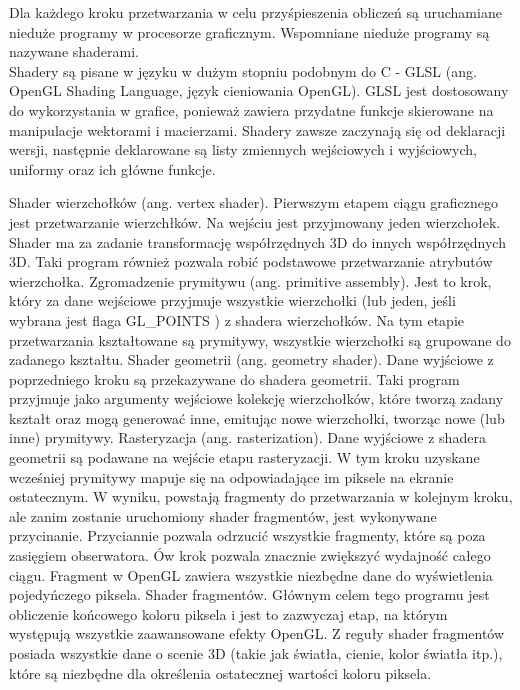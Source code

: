  Dla każdego kroku przetwarzania w celu przyśpieszenia obliczeń są uruchamiane nieduże programy w procesorze graficznym. Wspomniane nieduże programy są nazywane shaderami.\\
Shadery są pisane w języku w dużym stopniu podobnym do C - GLSL (ang. OpenGL Shading Language, język cieniowania OpenGL). GLSL jest dostosowany do wykorzystania w grafice, ponieważ zawiera przydatne funkcje skierowane na manipulacje wektorami i macierzami. Shadery zawsze zaczynają się od deklaracji wersji, następnie deklarowane są listy zmiennych wejściowych i wyjściowych, uniformy oraz ich główne funkcje. \\

\begin{itemize} 
\itemi Shader wierzchołków (ang. vertex shader). Pierwszym etapem ciągu graficznego jest przetwarzanie wierzchłków. Na wejściu jest przyjmowany jeden wierzchołek. Shader ma za zadanie transformację współrzędnych 3D do innych współrzędnych 3D. Taki program również pozwala robić podstawowe przetwarzanie atrybutów wierzchołka.
\itemi Zgromadzenie prymitywu (ang. primitive assembly). Jest to krok, który za dane wejściowe przyjmuje wszystkie wierzchołki (lub jeden, jeśli wybrana jest flaga GL\_POINTS ) z shadera wierzchołków. Na tym etapie przetwarzania kształtowane są prymitywy, wszystkie wierzchołki są grupowane do zadanego kształtu.
\itemi Shader geometrii (ang. geometry shader). Dane wyjściowe z poprzedniego kroku są przekazywane do shadera geometrii. Taki program przyjmuje jako argumenty wejściowe kolekcję wierzchołków, które tworzą zadany kształt oraz mogą generować inne, emitując nowe wierzchołki, tworząc nowe (lub inne) prymitywy. 
\itemi Rasteryzacja (ang. rasterization). Dane wyjściowe z shadera geometrii są podawane na wejście etapu rasteryzacji. W tym kroku uzyskane wcześniej prymitywy mapuje się na odpowiadające im piksele na ekranie ostatecznym. W wyniku, powstają fragmenty do przetwarzania w kolejnym kroku, ale zanim zostanie uruchomiony shader fragmentów, jest wykonywane przycinanie. Przyciannie pozwala odrzucić wszystkie fragmenty, które są poza zasięgiem obserwatora. Ów krok pozwala znacznie zwiększyć wydajność całego ciągu. Fragment w OpenGL zawiera wszystkie niezbędne dane do wyświetlenia pojedyńczego piksela.
\itemi Shader fragmentów. Głównym celem tego programu jest obliczenie końcowego koloru piksela i jest to zazwyczaj etap, na którym występują wszystkie zaawansowane efekty OpenGL. Z reguły shader fragmentów posiada wszystkie dane o scenie 3D (takie jak światła, cienie, kolor światła itp.), które są niezbędne dla określenia ostatecznej wartości koloru piksela.
\end{itemize}

